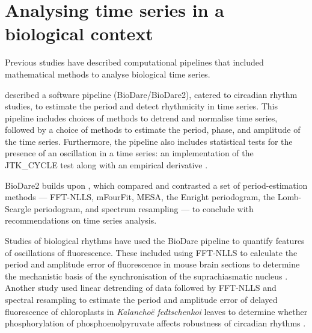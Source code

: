 \section{Analysing time series in a biological context}
\label{sec:analysis-literature}

Previous studies have described computational pipelines that included mathematical methods to analyse biological time series.

\textcite{zielinskiPeriodEstimationRhythm2022} described a software pipeline (BioDare/BioDare2), catered to circadian rhythm studies, to estimate the period and detect rhythmicity in time series.
This pipeline includes choices of methods to detrend and normalise time series, followed by a choice of methods to estimate the period, phase, and amplitude of the time series.
Furthermore, the pipeline also includes statistical tests for the presence of an oscillation in a time series: an implementation of the JTK\_CYCLE test \parencite{hughesJTK_CYCLEEfficientNonparametric2010} along with an empirical derivative \parencite{hutchisonImprovedStatisticalMethods2015a}.

BioDare2 builds upon \textcite{zielinskiStrengthsLimitationsPeriod2014}, which compared and contrasted a set of period-estimation methods ---
FFT-NLLS, mFourFit, MESA, the Enright periodogram, the Lomb-Scargle periodogram, and spectrum resampling --- to conclude with recommendations on time series analysis.

Studies of biological rhythms have used the BioDare pipeline to quantify features of oscillations of fluorescence.
These included using FFT-NLLS to calculate the period and amplitude error of fluorescence in mouse brain sections to determine the mechanistic basis of the synchronisation of the suprachiasmatic nucleus \parencite{hamnettVasoactiveIntestinalPeptide2019}.
Another study used linear detrending of data followed by FFT-NLLS and spectral resampling to estimate the period and amplitude error of delayed fluorescence of chloroplasts in \textit{Kalancho\"{e} fedtschenkoi} leaves to determine whether phosphorylation of phosphoenolpyruvate affects robustness of circadian rhythms \parencite{boxallPhosphorylationPhosphoenolpyruvateCarboxylase2017}.

